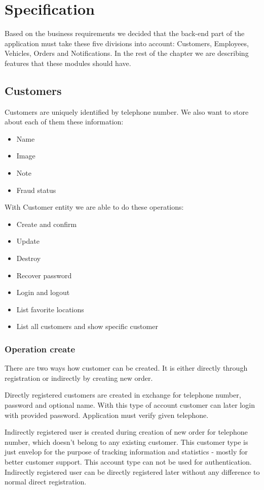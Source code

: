 \chapter{Specification}

Based on the business requirements we decided that the back-end part of the application must take these five divisions into account: Customers, Employees, Vehicles, Orders and Notifications. In the rest of the chapter we are describing features that these modules should have.
\section{Customers}
Customers are uniquely identified by telephone number. We also want to store about each of them these information:
\begin{itemize}
	\item Name
	\item Image
	\item Note
	\item Fraud status
\end{itemize}
With Customer entity we are able to do these operations:
\begin{itemize}
	\item Create and confirm
	\item Update
	\item Destroy
	\item Recover password
	\item Login and logout
	\item List favorite locations
	\item List all customers and show specific customer
\end{itemize}
\subsection{Operation create}
There are two ways how customer can be created. It is either directly through registration or indirectly by creating new order.

Directly registered customers are created in exchange for telephone number, password and optional name. With this type of account customer can later login with provided password. Application must verify given telephone.

Indirectly registered user is created during creation of new order for telephone number, which doesn't belong to any existing customer. This customer type is just envelop for the purpose of tracking information and statistics - mostly for better customer support. This account type can not be used for authentication. Indirectly registered user can be directly registered later without any difference to normal direct registration.


